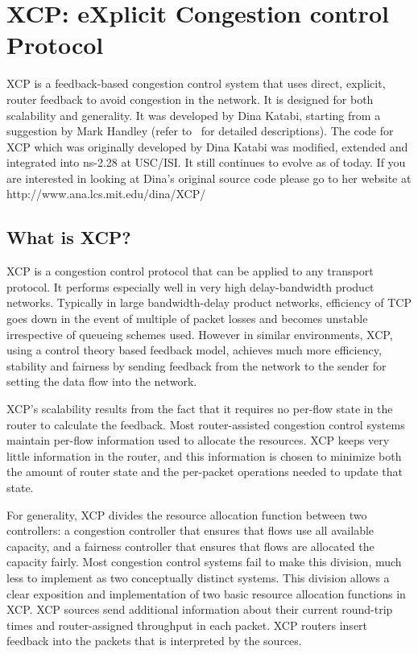%
\chapter{XCP: eXplicit Congestion control Protocol}
\label{chap:xcp}

XCP is a feedback-based congestion control system that uses direct,
explicit, router feedback to avoid congestion in the network.  It is
designed for both scalability and generality.  It was developed by
Dina Katabi, starting from a suggestion by Mark Handley (refer
to~\cite{Katabi02} for detailed descriptions). 
The \ns{} code for XCP which was originally developed by Dina Katabi was
modified, extended and integrated into ns-2.28 at USC/ISI. It still
continues to evolve as of today. If you are interested in looking at
Dina's original source code please go to her website at
http://www.ana.lcs.mit.edu/dina/XCP/ 

\section{What is XCP?}
\label{sec:xcp?}
XCP is a congestion control protocol that can be applied to any
transport protocol. It performs especially well in very high
delay-bandwidth product networks. Typically in large bandwidth-delay
product networks, efficiency of TCP goes down in the event of multiple of
packet losses and becomes unstable irrespective of queueing schemes
used. However in similar environments, XCP, using a control theory
based feedback
model, achieves much more efficiency, stability and fairness by
sending feedback from the network to the sender for setting the data
flow into the network.

XCP's scalability results from the fact that it requires no per-flow
state in the router to calculate the feedback.  Most router-assisted
congestion control systems maintain per-flow information used to
allocate the resources.  XCP keeps very little information in the
router, and this information is chosen to minimize both the amount of
router state and the per-packet operations needed to update that state.

For generality, XCP divides the resource allocation function between
two controllers: a congestion controller that ensures that flows use
all available capacity, and a fairness controller that ensures that
flows are allocated the capacity fairly.  Most congestion control
systems fail to make this division, much less to implement as two
conceptually distinct systems.  This division allows a clear
exposition and implementation of two basic resource allocation
functions in XCP. XCP sources send additional information about their
current round-trip times and router-assigned throughput in each
packet. XCP routers insert feedback into the packets that is
interpreted by the sources. 
  
